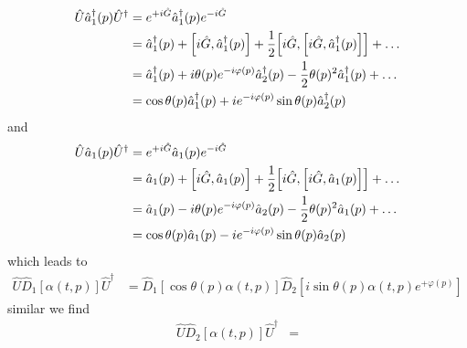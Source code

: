 \begin{equation}
	\begin{split}
		\hat{U}
		\hat{a}_1^\dagger(p)
		\hat{U}^\dagger
		&=
		e^{+i\hat{G}}
		\hat{a}_1^\dagger(p)
		e^{-i\hat{G}}
		\\
		&=
		\hat{a}_1^\dagger(p)
		+
		\comm{i\hat{G}}{\hat{a}_1^\dagger(p)}
		+
		\frac{1}{2}
		\comm{i\hat{G}}{\comm{i\hat{G}}{\hat{a}_1^\dagger(p)}}
		+
		\dots
		\\
		&=
		\hat{a}_1^\dagger(p)
		+
		i\theta(p)e^{-i\varphi(p)}
		\hat{a}_2^\dagger(p)
		-
		\frac{1}{2}
		\theta(p)^2
		\hat{a}_1^\dagger(p)
		+
		\dots
		\\
		&=
		\cos\theta(p)
		\hat{a}_1^\dagger(p)
		+
		ie^{-i\varphi(p)}
		\sin\theta(p)
		\hat{a}_2^\dagger(p)
	\end{split}
\end{equation}
and
\begin{equation}
	\begin{split}
		\hat{U}
		\hat{a}_1(p)
		\hat{U}^\dagger
		&=
		e^{+i\hat{G}}
		\hat{a}_1(p)
		e^{-i\hat{G}}
		\\
		&=
		\hat{a}_1(p)
		+
		\comm{i\hat{G}}{\hat{a}_1(p)}
		+
		\frac{1}{2}
		\comm{i\hat{G}}{\comm{i\hat{G}}{\hat{a}_1(p)}}
		+
		\dots
		\\
		&=
		\hat{a}_1(p)
		-
		i\theta(p)e^{-i\varphi(p)}
		\hat{a}_2(p)
		-
		\frac{1}{2}
		\theta(p)^2
		\hat{a}_1(p)
		+
		\dots
		\\
		&=
		\cos\theta(p)
		\hat{a}_1(p)
		-
		ie^{-i\varphi(p)}
		\sin\theta(p)
		\hat{a}_2(p)
	\end{split}
\end{equation}
which leads to
\begin{equation}
	\begin{split}
		\hat{U}
		\hat{D}_1[\alpha(t,p)]
		\hat{U}^\dagger
		&=
		\hat{D}_1[\cos\theta(p)\alpha(t,p)]
		\hat{D}_2[i\sin\theta(p)\alpha(t,p)e^{+\varphi(p)}]
	\end{split}
\end{equation}
similar we find
\begin{equation}
	\begin{split}
		\hat{U}
		\hat{D}_2[\alpha(t,p)]
		\hat{U}^\dagger
		&=
	\end{split}
\end{equation}